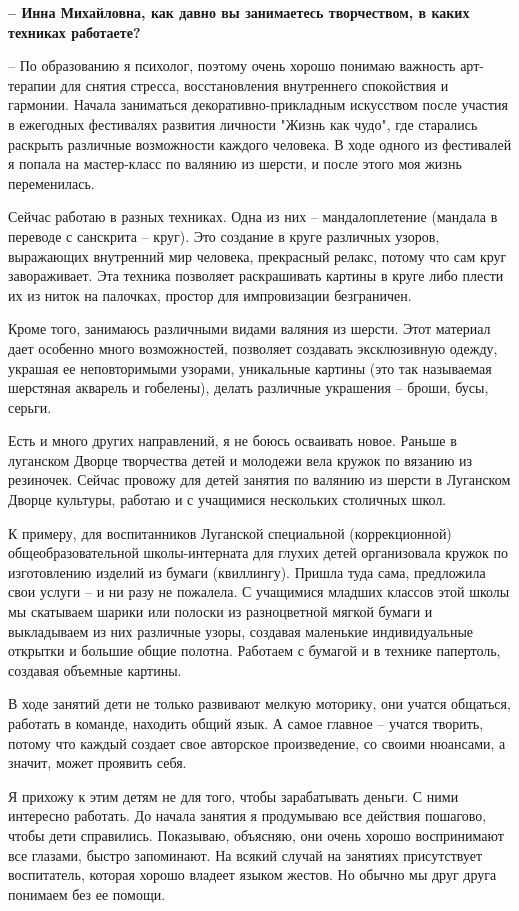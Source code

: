 \textbf{– Инна Михайловна, как давно вы занимаетесь творчеством, в каких техниках
работаете?}

– По образованию я психолог, поэтому очень хорошо понимаю важность арт-терапии
для снятия стресса, восстановления внутреннего спокойствия и гармонии. Начала
заниматься декоративно-прикладным искусством после участия в ежегодных
фестивалях развития личности "Жизнь как чудо", где старались раскрыть различные
возможности каждого человека. В ходе одного из фестивалей я попала на
мастер-класс по валянию из шерсти, и после этого моя жизнь переменилась.

Сейчас работаю в разных техниках. Одна из них – мандалоплетение (мандала в
переводе с санскрита – круг). Это создание в круге различных узоров, выражающих
внутренний мир человека, прекрасный релакс, потому что сам круг завораживает.
Эта техника позволяет раскрашивать картины в круге либо плести их из ниток на
палочках, простор для импровизации безграничен.

Кроме того, занимаюсь различными видами валяния из шерсти. Этот материал дает
особенно много возможностей, позволяет создавать эксклюзивную одежду, украшая
ее неповторимыми узорами, уникальные картины (это так называемая шерстяная
акварель и гобелены), делать различные украшения – броши, бусы, серьги. 

Есть и много других направлений, я не боюсь осваивать новое. Раньше в луганском
Дворце творчества детей и молодежи вела кружок по вязанию из резиночек. Сейчас
провожу для детей занятия по валянию из шерсти в Луганском Дворце культуры,
работаю и с учащимися нескольких столичных школ.   

К примеру, для воспитанников Луганской специальной (коррекционной)
общеобразовательной школы-интерната для глухих детей организовала кружок по
изготовлению изделий из бумаги (квиллингу). Пришла туда сама, предложила свои
услуги – и ни разу не пожалела. С учащимися младших классов этой школы мы
скатываем шарики или полоски из разноцветной мягкой бумаги и выкладываем из них
различные узоры, создавая маленькие индивидуальные открытки и большие общие
полотна. Работаем с бумагой и в технике папертоль, создавая объемные картины.

В ходе занятий дети не только развивают мелкую моторику, они учатся общаться,
работать в команде, находить общий язык. А самое главное – учатся творить,
потому что каждый создает свое авторское произведение, со своими нюансами, а
значит, может проявить себя.

Я прихожу к этим детям не для того, чтобы зарабатывать деньги. С ними интересно
работать. До начала занятия я продумываю все действия пошагово, чтобы дети
справились. Показываю, объясняю, они очень хорошо воспринимают все глазами,
быстро запоминают. На всякий случай на занятиях присутствует воспитатель,
которая хорошо владеет языком жестов. Но обычно мы друг друга понимаем без ее
помощи.  

